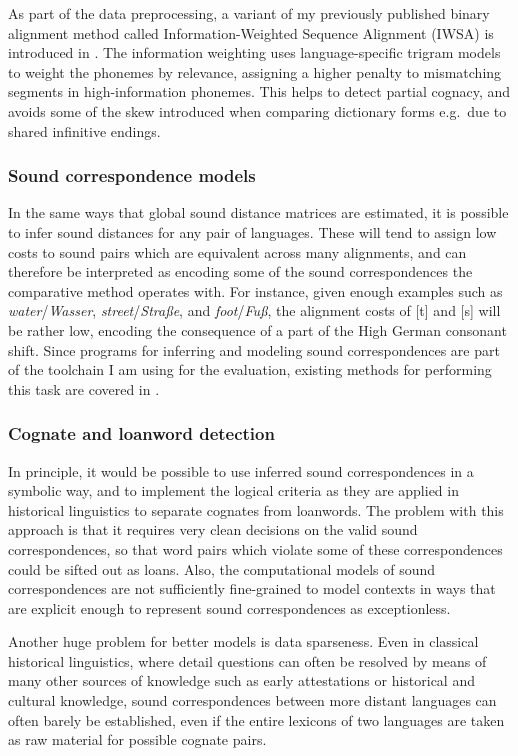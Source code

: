 As part of the data preprocessing, a variant of my previously published binary alignment method called Information-Weighted Sequence Alignment (IWSA) is introduced in . The information weighting uses language-specific trigram models to weight the phonemes by relevance, assigning a higher penalty to mismatching segments in high-information phonemes. This helps to detect partial cognacy, and avoids some of the skew introduced when comparing dictionary forms e.g.\ due to shared infinitive endings.

\subsubsection{Sound correspondence models}
In the same ways that global sound distance matrices are estimated, it is possible to infer sound distances for any pair of languages. These will tend to assign low costs to sound pairs which are equivalent across many alignments, and can therefore be interpreted as encoding some of the sound correspondences the comparative method operates with. For instance, given enough examples such as \textit{water}/\textit{Wasser}, \textit{street}/\textit{Stra\ss{}e}, and \textit{foot}/\textit{Fu\ss{}}, the alignment costs of  [t] and  [s] will be rather low, encoding the consequence of a part of the High German consonant shift. Since programs for inferring and modeling sound correspondences are part of the toolchain I am using for the evaluation, existing methods for performing this task are covered in .

\subsubsection{Cognate and loanword detection}
In principle, it would be possible to use inferred sound correspondences in a symbolic way, and to implement the logical criteria as they are applied in historical linguistics to separate cognates from loanwords. The problem with this approach is that it requires very clean decisions on the valid sound correspondences, so that word pairs which violate some of these correspondences could be sifted out as loans. Also, the computational models of sound correspondences are not sufficiently fine-grained to model contexts in ways that are explicit enough to represent sound correspondences as exceptionless.

Another huge problem for better models is data sparseness. Even in classical historical linguistics, where detail questions can often be resolved by means of many other sources of knowledge such as early attestations or historical and cultural knowledge, sound correspondences between more distant languages can often barely be established, even if the entire lexicons of two languages are taken as raw material for possible cognate pairs.

